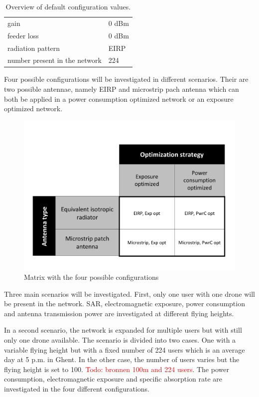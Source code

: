 \documentclass[twocolumn]{phdsymp} %
\begin{document}
\begin{table}[!htb]
\begin{tabular}[t]{ll}
        \hspace{3mm} gain                      & 0 dBm   \\ 
        \hspace{3mm} feeder loss               & 0 dBm   \\ 
        \hspace{3mm} radiation pattern         & EIRP  \\
        \hspace{3mm} number present in the network         & 224  \\
        \toprule
\end{tabular}
\caption{Overview of default configuration values.}
\end{table}


Four possible configurations  will be investigated in different scenarios. Their are two possible antennae, namely EIRP 
and microstrip pach antenna which can both be applied in a power consumption optimized network or an exposure optimized network.

\begin{figure}[h!]
  \includegraphics[width=\linewidth]{fourCasesMatrix.pdf}
  \caption{Matrix with the four possible configurations}
  \label{fig:fourCasesMatrix}
\end{figure}

Three main scenarios will be investigated. 
First, only one user with one drone will be present in the network. SAR, electromagnetic exposure, power consumption 
and antenna transmission power are investigated at different flying heights.

In a second scenario, the network is expanded for multiple users but with still only one drone available. 
The scenario is divided into two cases. One with a variable flying height but with a fixed 
number of 224 users which is an average day 
at 5 p.m. in Ghent. In the other case, the number of users varies but the flying height is set to 100. 
\textcolor{red}{Todo: bronnen 100m and 224 users}. The power consumption, electromagnetic exposure and specific 
absorption rate are investigated in the four different configurations.
\end{document}
